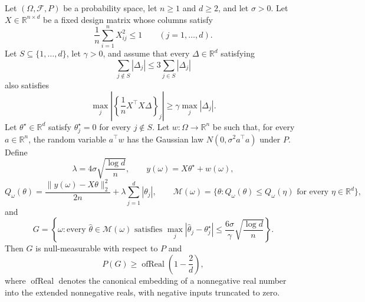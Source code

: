 \begin{theorem}
Let $(\Omega,\mathcal F,P)$ be a probability space, let $n\ge 1$ and
$d\ge 2$, and let $\sigma>0$.  Let $X\in\mathbb R^{n\times d}$ be a
fixed design matrix whose columns satisfy
\[
  \frac{1}{n}\sum_{i=1}^n X_{ij}^2\le 1
  \qquad (j=1,\ldots,d).
\]
Let $S\subseteq\{1,\ldots,d\}$, let $\gamma>0$, and assume that every
$\Delta\in\mathbb R^d$ satisfying
\[
  \sum_{j\notin S}|\Delta_j|
  \le 3\sum_{j\in S}|\Delta_j|
\]
also satisfies
\[
  \max_j\left|\left\{\frac1nX^\top X\Delta\right\}_j\right|
  \ge \gamma\max_j|\Delta_j|.
\]
Let $\theta^\star\in\mathbb R^d$ satisfy $\theta_j^\star=0$ for every
$j\notin S$.  Let $w:\Omega\to\mathbb R^n$ be such that, for every
$a\in\mathbb R^n$, the random variable $a^\top w$ has the Gaussian law
$N(0,\sigma^2 a^\top a)$ under $P$.  Define
\[
  \lambda=4\sigma\sqrt{\frac{\log d}{n}},
  \qquad y(\omega)=X\theta^\star+w(\omega),
\]
\[
  Q_\omega(\theta)=\frac{\|y(\omega)-X\theta\|_2^2}{2n}
    +\lambda\sum_{j=1}^d|\theta_j|,
  \qquad
  \mathcal M(\omega)=
    \{\theta:Q_\omega(\theta)\le Q_\omega(\eta)
      \text{ for every }\eta\in\mathbb R^d\},
\]
and
\[
  G=\left\{\omega:
    \text{every }\widehat\theta\in\mathcal M(\omega)\text{ satisfies }
    \max_j|\widehat\theta_j-\theta_j^\star|
    \le \frac{6\sigma}{\gamma}\sqrt{\frac{\log d}{n}}
  \right\}.
\]
Then $G$ is null-measurable with respect to $P$ and
\[
  P(G)\ge \operatorname{ofReal}\!\left(1-\frac{2}{d}\right),
\]
where $\operatorname{ofReal}$ denotes the canonical embedding of a
nonnegative real number into the extended nonnegative reals, with negative
inputs truncated to zero.
\end{theorem}
